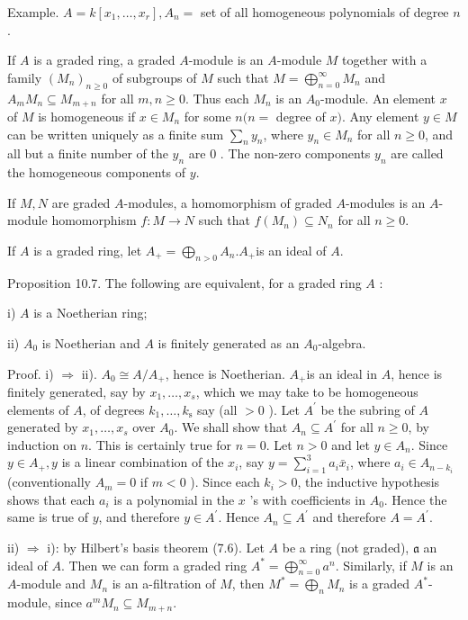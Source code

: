 \documentclass{standalone}
\theoremstyle{definition}
\theoremstyle{remark}
\begin{document}
Example. $A=k\left[x_{1}, \ldots, x_{r}\right], A_{n}=$ set of all homogeneous polynomials of degree $n$.

If $A$ is a graded ring, a graded $A$-module is an $A$-module $M$ together with a family $\left(M_{n}\right)_{n \geq 0}$ of subgroups of $M$ such that $M=\bigoplus_{n=0}^{\infty} M_{n}$ and $A_{m} M_{n} \subseteq M_{m+n}$ for all $m, n \geqslant 0$. Thus each $M_{n}$ is an $A_{0}$-module. An element $x$ of $M$ is homogeneous if $x \in M_{n}$ for some $n(n=$ degree of $x)$. Any element $y \in M$ can be written uniquely as a finite sum $\sum_{n} y_{n}$, where $y_{n} \in M_{n}$ for all $n \geqslant 0$, and all but a finite number of the $y_{n}$ are 0 . The non-zero components $y_{n}$ are called the homogeneous components of $y$.

If $M, N$ are graded $A$-modules, a homomorphism of graded $A$-modules is an $A$-module homomorphism $f: M \rightarrow N$ such that $f\left(M_{n}\right) \subseteq N_{n}$ for all $n \geqslant 0$.

If $A$ is a graded ring, let $A_{+}=\bigoplus_{n>0} A_{n} . A_{+}$is an ideal of $A$.

Proposition 10.7. The following are equivalent, for a graded ring $A$ :

i) $A$ is a Noetherian ring;

ii) $A_{0}$ is Noetherian and $A$ is finitely generated as an $A_{0}$-algebra.

Proof. i) $\Rightarrow$ ii). $A_{0} \cong A / A_{+}$, hence is Noetherian. $A_{+}$is an ideal in $A$, hence is finitely generated, say by $x_{1}, \ldots, x_{s}$, which we may take to be homogeneous elements of $A$, of degrees $k_{1}, \ldots, k_{\mathrm{s}}$ say (all $>0$ ). Let $A^{\prime}$ be the subring of $A$ generated by $x_{1}, \ldots, x_{s}$ over $A_{0}$. We shall show that $A_{n} \subseteq A^{\prime}$ for all $n \geqslant 0$, by induction on $n$. This is certainly true for $n=0$. Let $n>0$ and let $y \in A_{n}$. Since $y \in A_{+}, y$ is a linear combination of the $x_{i}$, say $y=\sum_{i=1}^{3} a_{i} \bar{x}_{i}$, where $a_{i} \in A_{n-k_{i}}$ (conventionally $A_{m}=0$ if $m<0$ ). Since each $k_{i}>0$, the inductive hypothesis shows that each $a_{i}$ is a polynomial in the $x$ 's with coefficients in $A_{0}$. Hence the same is true of $y$, and therefore $y \in A^{\prime}$. Hence $A_{n} \subseteq A^{\prime}$ and therefore $A=A^{\prime}$.

ii) $\Rightarrow$ i): by Hilbert's basis theorem (7.6). Let $A$ be a ring (not graded), $\mathfrak{a}$ an ideal of $A$. Then we can form a graded ring $A^{*}=\bigoplus_{n=0}^{\infty} a^{n}$. Similarly, if $M$ is an $A$-module and $M_{n}$ is an a-filtration of $M$, then $M^{*}=\bigoplus_{n} M_{n}$ is a graded $A^{*}$-module, since $a^{m} M_{n} \subseteq M_{m+n}$.
\end{document}
